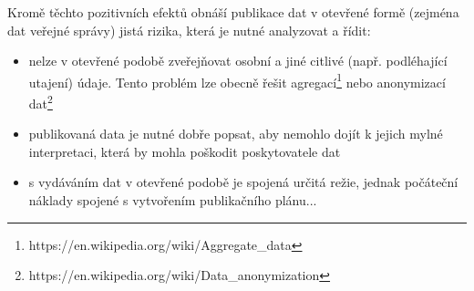 Kromě těchto pozitivních efektů obnáší publikace dat v otevřené formě (zejména dat veřejné správy) jistá rizika, která je nutné analyzovat a řídit:
\begin{itemize}
	\item nelze v otevřené podobě zveřejňovat osobní a jiné citlivé (např. podléhající utajení) údaje. Tento problém lze obecně řešit agregací\footnote{https://en.wikipedia.org/wiki/Aggregate\_data} nebo anonymizací dat\footnote{https://en.wikipedia.org/wiki/Data\_anonymization}
	\item publikovaná data je nutné dobře popsat, aby nemohlo dojít k jejich mylné interpretaci, která by mohla poškodit poskytovatele dat
	\item s vydáváním dat v otevřené podobě je spojená určitá režie, jednak počáteční náklady spojené s vytvořením publikačního plánu...
\end{itemize}